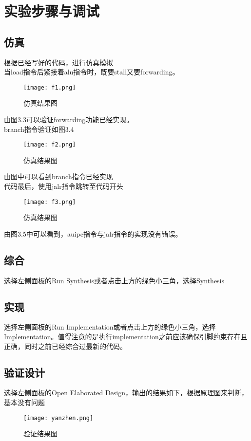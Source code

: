 
\section{实验步骤与调试}
\subsection{仿真} 根据已经写好的代码，进行仿真模拟\\
当load指令后紧接着alu指令时，既要stall又要forwarding。
\begin{figure}
	\centering %
	\texttt{[image: f1.png]} %
	\caption{仿真结果图} %
	\label{Fig.3} %
\end{figure}
由图3.3可以验证forwarding功能已经实现。\\
branch指令验证如图3.4
\begin{figure}
	\centering %
	\texttt{[image: f2.png]} %
	\caption{仿真结果图} %
	\label{Fig.4} %
\end{figure}
由图中可以看到branch指令已经实现\\
代码最后，使用jalr指令跳转至代码开头
\begin{figure}
	\centering %
	\texttt{[image: f3.png]} %
	\caption{仿真结果图} %
	\label{Fig.5} %
\end{figure}
由图3.5中可以看到，auipc指令与jalr指令的实现没有错误。
\subsection{综合} 选择左侧面板的Run Synthesis或者点击上方的绿色小三角，选择Synthesis
\subsection{实现} 选择左侧面板的Run Implementation或者点击上方的绿色小三角，选择Implementation。值得注意的是执行implementation之前应该确保引脚约束存在且正确，同时之前已经综合过最新的代码。
\subsection{验证设计} 选择左侧面板的Open Elaborated Design，输出的结果如下，根据原理图来判断，基本没有问题
\begin{figure}[H] %
    \centering %
    \texttt{[image: yanzhen.png]} %
    \caption{验证结果图} %
    \label{Fig.6} %
\end{figure}
